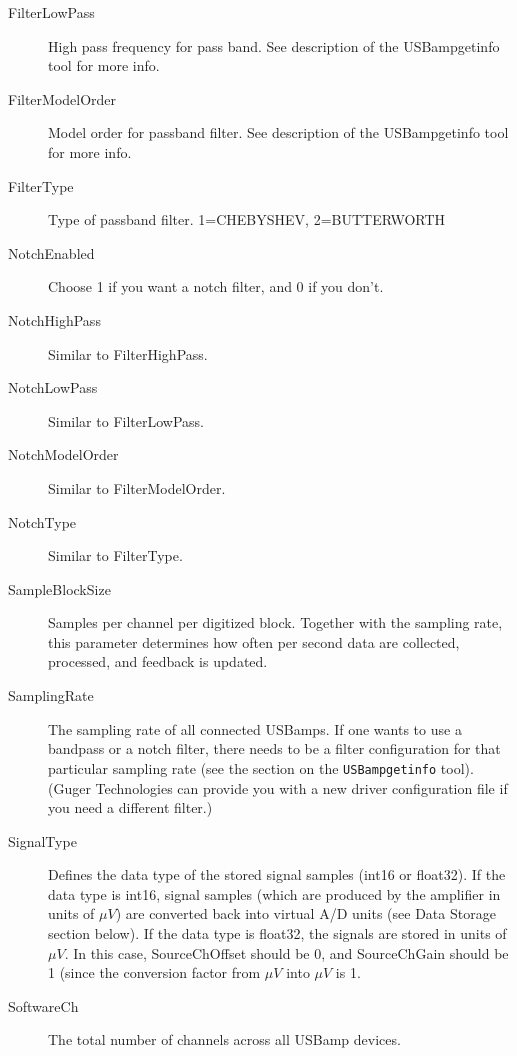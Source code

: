 \documentclass[letterpaper, oneside, 12pt]{article}
\begin{document}
\begin{description}
 \item [FilterLowPass]  High pass frequency for pass band. See description
                        of the USBampgetinfo tool for more info.
 \item [FilterModelOrder] Model order for passband filter. See description
                        of the USBampgetinfo tool for more info.
 \item [FilterType]     Type of passband filter. 1=CHEBYSHEV, 2=BUTTERWORTH
 \item [NotchEnabled]   Choose 1 if you want a notch filter,
                        and 0 if you don't.
 \item [NotchHighPass]     Similar to FilterHighPass.
 \item [NotchLowPass]      Similar to FilterLowPass.
 \item [NotchModelOrder]   Similar to FilterModelOrder.
 \item [NotchType]         Similar to FilterType.
 \item [SampleBlockSize]   Samples per channel per digitized block. Together with the sampling rate,
                           this parameter determines how often per second data are collected, processed,
                           and feedback is updated.
 \item [SamplingRate]      The sampling rate of all connected USBamps. If one wants to 
                           use a bandpass or a notch filter, there needs to be a filter
                           configuration for that particular sampling rate (see the section
                           on the \texttt{USBampgetinfo} tool). (Guger Technologies can
                           provide you with a new driver configuration file if you need
                           a different filter.)
 \item [SignalType]        Defines the data type of the stored signal samples (int16 or float32).
                           If the data type is int16, signal samples (which are produced by
                           the amplifier in units of $\mu V$) are converted back into virtual A/D units
                           (see Data Storage section below). If the data type is float32, the signals
                           are stored in units of $\mu V$.
                           In this case, SourceChOffset should be 0, and SourceChGain should be
                           1 (since the conversion factor from $\mu V$ into $\mu V$ is 1. 
 \item [SoftwareCh]        The total number of channels across all USBamp devices.

\end{description}
\end{document}
